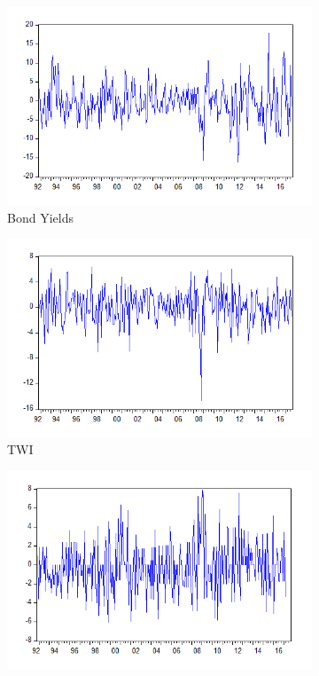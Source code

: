 \documentclass[11pt]{article}
\begin{document}
\begin{figure}
	\centering
	\begin{subfigure}[t]{0.31\textwidth}
		\centering
		\includegraphics[width=\linewidth]{s_bond.png} 
		\caption{Bond Yields} \label{fig:sbond}
	\end{subfigure}
	\hfill
	\begin{subfigure}[t]{0.31\textwidth}
		\centering
		\includegraphics[width=\linewidth]{s_exr.png} 
		\caption{TWI} \label{fig:stwi}
	\end{subfigure}
	\hfill
	\begin{subfigure}[t]{0.31\textwidth}
	\centering
	\includegraphics[width=\linewidth]{s_une.png} 

\end{subfigure}
\end{figure}
\end{document}
